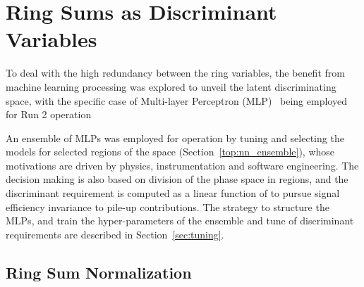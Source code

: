 \section{Ring Sums as Discriminant Variables}\label{ssec:ringer_id}



To deal with the high redundancy between the ring variables, the benefit from machine learning processing was explored to unveil the latent discriminating space, with the specific case of Multi-layer Perceptron (MLP)~\cite{haykin_2008} being employed for Run 2 operation

An ensemble of MLPs was employed for operation by tuning and selecting
the models for selected regions of the \eteta space (Section~\ref{top:nn_ensemble}), whose
motivations are driven by physics, instrumentation and software 
engineering. The \rnn
decision making is also based on division of the phase space in regions, and the discriminant requirement is
computed as a linear function of \avgmu to pursue signal efficiency invariance
to pile-up contributions. 
The strategy to structure the MLPs,  and train the hyper-parameters of the ensemble and tune of discriminant requirements 
are described in Section~\ref{sec:tuning}.


%

\subsection{Ring Sum Normalization}\label{top:pp}

